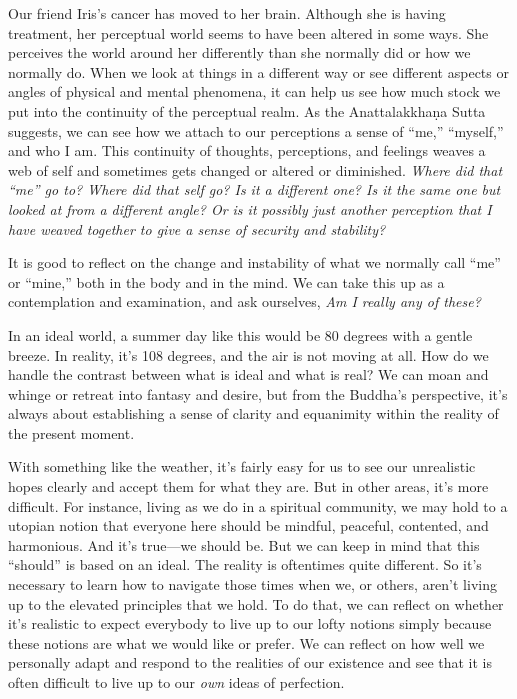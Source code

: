 Our friend Iris's cancer has moved to her brain. Although she is having 
treatment, her perceptual world seems to have been altered in some 
ways. She perceives the world around her differently than she normally 
did or how we normally do. When we look at things in a different way or 
see different aspects or angles of physical and mental phenomena, it 
can help us see how much stock we put into the continuity of the 
perceptual realm. As the Anattalakkhaṇa Sutta suggests, we can see 
how we attach to our perceptions a sense of ``me,'' ``myself,'' and who 
I am. This continuity of thoughts, perceptions, and feelings weaves a 
web of self and sometimes gets changed or altered or diminished. 
\emph{Where did that ``me'' go to? Where did that self go? Is it a 
different one? Is it the same one but looked at from a different angle? 
Or is it possibly just another perception that I have weaved together 
to give a sense of security and stability?}

It is good to reflect on the change and instability of what we normally 
call ``me'' or ``mine,'' both in the body and in the mind. We can take 
this up as a contemplation and examination, and ask ourselves, \emph{Am 
I really any of these?}


In an ideal world, a summer day like this would be 80 degrees with a 
gentle breeze. In reality, it's 108 degrees, and the air is not moving 
at all. How do we handle the contrast between what is ideal and what is 
real? We can moan and whinge or retreat into fantasy and desire, but 
from the Buddha's perspective, it's always about establishing a sense 
of clarity and equanimity within the reality of the present moment.

With something like the weather, it's fairly easy for us to see our 
unrealistic hopes clearly and accept them for what they are. But in 
other areas, it's more difficult. For instance, living as we do in a 
spiritual community, we may hold to a utopian notion that everyone here 
should be mindful, peaceful, contented, and harmonious. And it's 
true---we should be. But we can keep in mind that this ``should'' is 
based on an ideal. The reality is oftentimes quite different. So it's 
necessary to learn how to navigate those times when we, or others, 
aren't living up to the elevated principles that we hold. To do that, 
we can reflect on whether it's realistic to expect everybody to live up 
to our lofty notions simply because these notions are what we would 
like or prefer. We can reflect on how well we personally adapt and 
respond to the realities of our existence and see that it is often 
difficult to live up to our \emph{own} ideas of perfection.

